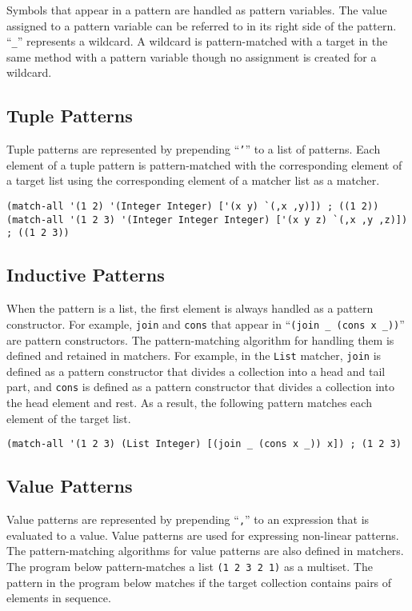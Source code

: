 \documentclass[acmlarge]{acmart}
\begin{document}
Symbols that appear in a pattern are handled as pattern variables.
The value assigned to a pattern variable can be referred to in its right side of the pattern.
``\verb|_|'' represents a wildcard.
A wildcard is pattern-matched with a target in the same method with a pattern variable though no assignment is created for a wildcard.

\subsection{Tuple Patterns}

Tuple patterns are represented by prepending ``\texttt{'}'' to a list of patterns.
Each element of a tuple pattern is pattern-matched with the corresponding element of a target list using the corresponding element of a matcher list as a matcher.

\begin{lstlisting}[language=egison]
(match-all '(1 2) '(Integer Integer) ['(x y) `(,x ,y)]) ; ((1 2))
(match-all '(1 2 3) '(Integer Integer Integer) ['(x y z) `(,x ,y ,z)]) ; ((1 2 3))
\end{lstlisting}

\subsection{Inductive Patterns}

When the pattern is a list, the first element is always handled as a pattern constructor.
For example, \texttt{join} and \texttt{cons} that appear in ``\verb|(join _ (cons x _))|'' are pattern constructors.
The pattern-matching algorithm for handling them is defined and retained in matchers.
For example, in the \texttt{List} matcher, \texttt{join} is defined as a pattern constructor that divides a collection into a head and tail part, and \texttt{cons} is defined as a pattern constructor that divides a collection into the head element and rest.
As a result, the following pattern matches each element of the target list.

\begin{lstlisting}[language=egison]
(match-all '(1 2 3) (List Integer) [(join _ (cons x _)) x]) ; (1 2 3)
\end{lstlisting}

\subsection{Value Patterns}

Value patterns are represented by prepending ``\texttt{,}'' to an expression that is evaluated to a value.
Value patterns are used for expressing non-linear patterns.
The pattern-matching algorithms for value patterns are also defined in matchers.
The program below pattern-matches a list \texttt{(1 2 3 2 1)} as a multiset.
The pattern in the program below matches if the target collection contains pairs of elements in sequence.
\end{document}

